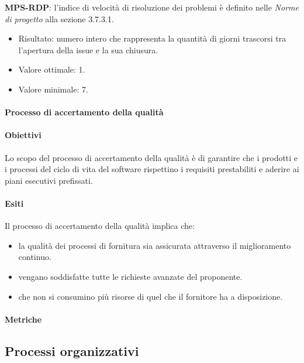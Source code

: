 \documentclass[../piano-di-qualifica.tex]{subfiles}
\begin{document}
\textbf{MPS-RDP}: l'indice di velocità di risoluzione dei problemi è definito nelle \textit{Norme di progetto} alla sezione 3.7.3.1.
\begin{itemize}
  \item Risultato: numero intero che rappresenta la quantità di giorni trascorsi tra l'apertura della issue e la sua chiusura.
  \item Valore ottimale: 1.
  \item Valore minimale: 7.
\end{itemize}

\paragraph{Processo di accertamento della qualità}%
\label{par:processo_di_accertamento_della_qualita}

\paragraph{Obiettivi}%
\label{par:obiettivi_accertamento_della_qualita}

Lo scopo del processo di accertamento della qualità è di garantire che i prodotti e i processi del ciclo di vita del software rispettino i requisiti prestabiliti e aderire ai piani esecutivi prefissati.

\paragraph{Esiti}%
\label{par:esiti}

Il processo di accertamento della qualità implica che:
\begin{itemize}
  \item la qualità dei processi di fornitura sia assicurata attraverso il miglioramento continuo.
  \item vengano soddisfatte tutte le richieste avanzate del proponente.
  \item che non si consumino più risorse di quel che il fornitore ha a disposizione.
\end{itemize}

\paragraph{Metriche}%
\label{par:metriche_prob}

\subsection{Processi organizzativi}%
\label{sub:processi_organizzativi}
\end{document}
